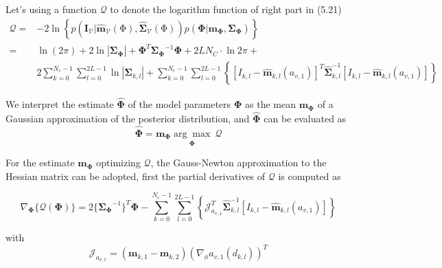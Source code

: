 Let's using a function $\mathcal{Q}$ to denote the logarithm function
of right part in (5.21)
\begin{align}
  \label{eq:5.22}
  \mathcal{Q} = & -2 \ln \left\{  p(\mathbf{\mathbf{I}_{\mathcal{V}}}
    |\hat{\mathbf{\mathbf{m}}}_{\mathcal{V}}(\mathrm{\Phi}),\hat{\mathbf{\mathbf{\Sigma}}}_{\mathcal{V}}(\mathrm{\Phi}))p(\mathbf{\Phi}
    | \mathbf{m}_{\mathbf{\Phi}},
    \mathbf{\mathbf{\Sigma}}_{\mathbf{\Phi}})\right\}\nonumber\\
 = & \ln{(2\pi)} + 2\ln{|\mathbf{\Sigma}_{\mathbf{\Phi}}|} +
 {\mathbf{\Phi}}^T{\mathbf{\Sigma}_{\mathbf{\Phi}}}^{-1}\mathbf{\Phi}
 + 2LN_{C} \cdot \ln{2\pi} + \nonumber \\
& 2\sum_{k = 0}^{N_{c}-1} \sum_{l=0}^{2L-1}{\ln{|\mathbf{\Sigma}_{k,l}|}} + \sum_{k = 0}^{N_{c}-1} \sum_{l=0}^{2L-1}
\left\{{\left[I_{k,l}-\hat{\mathbf{m}}_{k,l}(a_{v,1})\right]^T\hat{\mathbf{\Sigma}}_{k,l}^{-1}\left[I_{k,l}-\hat{\mathbf{m}}_{k,l}(a_{v,1})\right]}\right\}
\end{align}

We interpret the estimate $\hat{\mathbf{\Phi}}$ of the model
parameters $\mathbf{\Phi}$ as  the mean $\mathbf{m}_{\mathbf{\Phi}}$ of a Gaussian
approximation of the posterior distribution, and $\hat{\mathbf{\Phi}}$ can be evaluated as 
\begin{equation}
  \label{eq:5.23}
  \hat{\mathbf{\Phi}} = \mathbf{m}_{\mathbf{\Phi}}\underset{\mathbf{\Phi}}{\arg\max} \ \mathcal{Q}
\end{equation}

For the estimate $\mathbf{m}_{\mathbf{\Phi}}$ optimizing
$\mathcal{Q}$, the Gauss-Newton approximation to
the Hessian matrix can be adopted, first the partial derivatives of
$\mathcal{Q}$ is computed as 

\begin{equation}
\label{eq:5.24}
\nabla_{\mathbf{\Phi}}\{{\mathcal{Q}(\mathbf{\Phi})}\} =  2\{{\mathbf{\Sigma}_{\mathbf{\Phi}}}^{-1}\}^{T}{\mathbf{\Phi}} - \sum_{k = 0}^{N_{c}-1} \sum_{l=0}^{2L-1}
\left\{\mathcal{J}_{a_{v,1}}^T\hat{\mathbf{\Sigma}}_{k,l}^{-1}\left[I_{k,l}-\hat{\mathbf{m}}_{k,l}(a_{v,1})\right]\right\}
\end{equation}

with 
\begin{equation}
  \label{eq:5.25}
  \mathcal{J}_{a_{v,1}} = \left( \mathbf{m}_{k,1} -\mathbf{m}_{k,2} \right)(\nabla_{\phi} a_{v,1}(d_{k,l}))^T
\end{equation}

